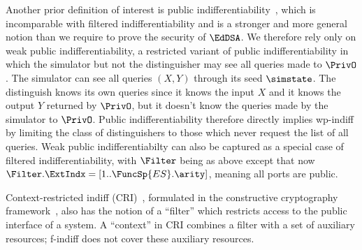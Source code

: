 Another prior definition of interest is public indifferentiability~\cite{EC:DodRisShr09}\cite{PROVSEC:YonMiyOht08}, which is incomparable with filtered indifferentiability and is a stronger and more general notion than we require to prove the security of $\EdDSA$.
We therefore rely only on weak public indifferentiability, a restricted variant of public indifferentiability in which the simulator but not the distinguisher may see all queries made to $\PrivO$. The simulator can see all queries $(X,Y)$ through its seed $\simstate$. The distinguish knows its own queries since it knows the input $X$ and it knows the output $Y$ returned by $\PrivO$, but it doesn't know the queries made by the simulator to $\PrivO$.
Public indifferentiability therefore directly implies wp-indiff by limiting the class of distinguishers to those which never request the list of all queries.
Weak public indifferentiabilty can also be captured as a special case of filtered indifferentiability, with $\Filter$ being as above except that now $\Filter.\ExtIndx =  [1..\FuncSp{ES}.\arity]$, meaning all ports are public.

Context-restricted indiff (CRI)~\cite{SCN:JosMau18}, formulated in the constructive cryptography framework~\cite{ICS:MauRen11,TCC:MauRen16}, also has the notion of a ``filter'' which restricts access to the public interface of a system.
A ``context'' in CRI combines a filter with a set of auxiliary resources; f-indiff does not cover these auxiliary resources.

